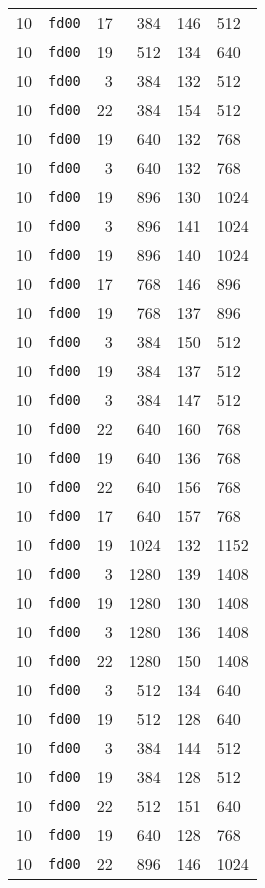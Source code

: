 \documentclass{article}
\begin{document}
\begin{table}[h!]
\begin{tabular}{llrrrl}
    10 & \texttt{fd00} & 17 & 384 & 146 & 512 \\
    10 & \texttt{fd00} & 19 & 512 & 134 & 640 \\
    10 & \texttt{fd00} & 3 & 384 & 132 & 512 \\
    10 & \texttt{fd00} & 22 & 384 & 154 & 512 \\
    10 & \texttt{fd00} & 19 & 640 & 132 & 768 \\
    10 & \texttt{fd00} & 3 & 640 & 132 & 768 \\
    10 & \texttt{fd00} & 19 & 896 & 130 & 1024 \\
    10 & \texttt{fd00} & 3 & 896 & 141 & 1024 \\
    10 & \texttt{fd00} & 19 & 896 & 140 & 1024 \\
    10 & \texttt{fd00} & 17 & 768 & 146 & 896 \\
    10 & \texttt{fd00} & 19 & 768 & 137 & 896 \\
    10 & \texttt{fd00} & 3 & 384 & 150 & 512 \\
    10 & \texttt{fd00} & 19 & 384 & 137 & 512 \\
    10 & \texttt{fd00} & 3 & 384 & 147 & 512 \\
    10 & \texttt{fd00} & 22 & 640 & 160 & 768 \\
    10 & \texttt{fd00} & 19 & 640 & 136 & 768 \\
    10 & \texttt{fd00} & 22 & 640 & 156 & 768 \\
    10 & \texttt{fd00} & 17 & 640 & 157 & 768 \\
    10 & \texttt{fd00} & 19 & 1024 & 132 & 1152 \\
    10 & \texttt{fd00} & 3 & 1280 & 139 & 1408 \\
    10 & \texttt{fd00} & 19 & 1280 & 130 & 1408 \\
    10 & \texttt{fd00} & 3 & 1280 & 136 & 1408 \\
    10 & \texttt{fd00} & 22 & 1280 & 150 & 1408 \\
    10 & \texttt{fd00} & 3 & 512 & 134 & 640 \\
    10 & \texttt{fd00} & 19 & 512 & 128 & 640 \\
    10 & \texttt{fd00} & 3 & 384 & 144 & 512 \\
    10 & \texttt{fd00} & 19 & 384 & 128 & 512 \\
    10 & \texttt{fd00} & 22 & 512 & 151 & 640 \\
    10 & \texttt{fd00} & 19 & 640 & 128 & 768 \\
    10 & \texttt{fd00} & 22 & 896 & 146 & 1024 \\

\end{tabular}
\end{table}
\end{document}
